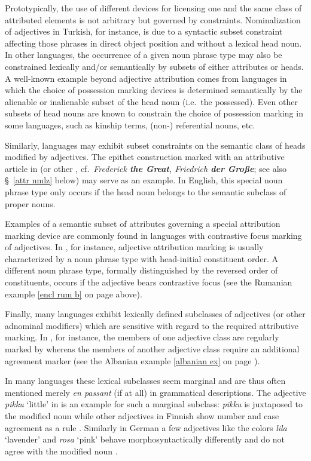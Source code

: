 Prototypically, the use of different devices for licensing one and the same class of attributed elements is not arbitrary but governed by constraints. Nominalization of adjectives in Turkish, for instance, is due to a syntactic subset constraint affecting those phrases in direct object position and without a lexical head noun. In other languages, the occurrence of a given noun phrase type may also be constrained lexically and/or semantically by subsets of either attributes or heads. A well-known example beyond adjective attribution comes from languages in which the choice of possession marking devices is determined semantically by the alienable or inalienable subset of the head noun (i.e.~the possessed). Even other subsets of head nouns are known to constrain the choice of possession marking in some languages, such as kinship terms, (non-) referential nouns, etc.

Similarly, languages may exhibit subset constraints on the semantic class of heads modified by adjectives. The epithet construction marked with an attributive article in  (or other , cf.~\textit{Frederick \textbf{the Great}, Friedrich \textbf{der Große}}; see also \S~\ref{attr nmlz} below) may serve as an example. In English, this special noun phrase type only occurs if the head noun belongs to the semantic subclass of proper nouns.

Examples of a semantic subset of attributes governing a special attribution marking device are commonly found in languages with contrastive focus marking of adjectives. In , for instance, adjective attribution marking is usually characterized by a noun phrase type with head-initial constituent order. A different noun phrase type, formally distinguished by the reversed order of constituents, occurs if the adjective bears contrastive focus (see the Rumanian example \ref{encl rum b} on page \pageref{encl rum b} above).

Finally, many languages exhibit lexically defined subclasses of adjectives (or other adnominal modifiers) which are sensitive with regard to the required attributive marking. In , for instance, the members of one adjective class are regularly marked by  whereas the members of another adjective class require an additional agreement marker (see the Albanian example \ref{albanian ex} on page \pageref{albanian synchr}).

In many languages these lexical subclasses seem marginal and are thus often mentioned merely \emph{en passant} (if at all) in grammatical descriptions. The adjective \textit{pikku} ‘little’ in  is an example for such a marginal subclass: \textit{pikku} is juxtaposed to the modified noun while other adjectives in Finnish show number and case agreement as a rule \citep[75]{karlsson1999}. Similarly in German a few adjectives like the colors \textit{lila} ‘lavender’ and \textit{rosa} ‘pink’ behave morphosyntactically differently and do not agree with the modified noun \citep[cf. also][243]{schafer2015a}.  

